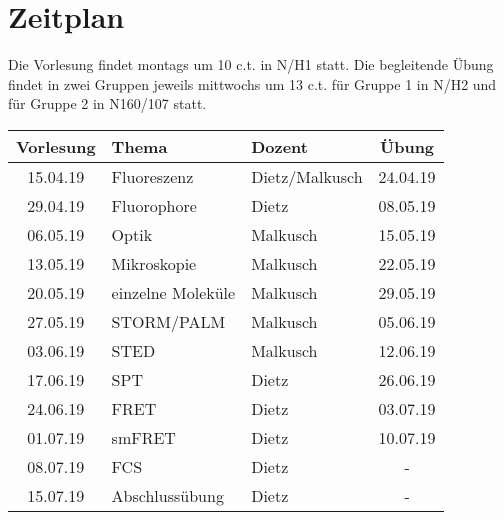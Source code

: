 \section{Zeitplan}
Die Vorlesung findet montags um 10 c.t. in N/H1 statt. Die begleitende Übung findet in zwei Gruppen jeweils mittwochs um 13 c.t. für Gruppe 1 in N/H2 und für Gruppe 2 in N160/107 statt.

\vspace{0.5cm}

\begin{center}
\begin{tabular}{cllc}
Vorlesung & Thema & Dozent & Übung\\
\hline
15.04.19 & Fluoreszenz & Dietz/Malkusch & 24.04.19\\
29.04.19 & Fluorophore & Dietz & 08.05.19\\
06.05.19 & Optik & Malkusch & 15.05.19\\
13.05.19 & Mikroskopie & Malkusch & 22.05.19\\
20.05.19 & einzelne Moleküle & Malkusch & 29.05.19\\
27.05.19 & STORM/PALM & Malkusch & 05.06.19\\
03.06.19 & STED & Malkusch & 12.06.19\\
17.06.19 & SPT & Dietz & 26.06.19\\
24.06.19 & FRET & Dietz & 03.07.19\\
01.07.19 & smFRET & Dietz & 10.07.19\\
08.07.19 & FCS & Dietz & -\\
15.07.19 & Abschlussübung & Dietz & -
\end{tabular}
\end{center}